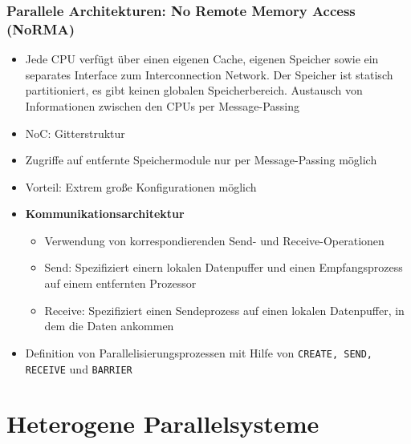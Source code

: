 \subsubsection{Parallele Architekturen: No Remote Memory Access (NoRMA)}
\begin{itemize}
	\item Jede CPU verfügt über einen eigenen Cache, eigenen Speicher sowie ein separates Interface zum Interconnection Network. Der Speicher ist statisch partitioniert, es gibt keinen globalen Speicherbereich. Austausch von Informationen zwischen den CPUs per Message-Passing
	\item NoC: Gitterstruktur
	\item Zugriffe auf entfernte Speichermodule nur per Message-Passing möglich
	\item Vorteil: Extrem große Konfigurationen möglich
	\item \textbf{Kommunikationsarchitektur}
	\begin{itemize}
		\item Verwendung von korrespondierenden Send- und Receive-Operationen
		\item Send: Spezifiziert einern lokalen Datenpuffer und einen Empfangsprozess auf einem entfernten Prozessor
		\item Receive: Spezifiziert einen Sendeprozess auf einen lokalen Datenpuffer, in dem die Daten ankommen
	\end{itemize}
	\item Definition von Parallelisierungsprozessen mit Hilfe von \texttt{CREATE, SEND, RECEIVE} und \texttt{BARRIER}
\end{itemize}


\section{Heterogene Parallelsysteme}

